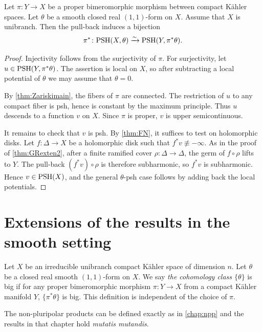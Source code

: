 \begin{corollary}\label{cor:PSH}
    Let $\pi\colon Y\rightarrow X$ be a proper bimeromorphic morphism between compact K\"ahler spaces. Let $\theta$ be a smooth closed real $(1,1)$-form on $X$. Assume that $X$ is unibranch. Then the pull-back induces a bijection
    \[
    \pi^*\colon \mathrm{PSH}(X,\theta)\xrightarrow[]{\sim}\mathrm{PSH}(Y,\pi^*\theta).
    \]
\end{corollary}
\begin{proof}
    Injectivity follows from the surjectivity of $\pi$. For surjectivity, let $u\in \mathrm{PSH}(Y,\pi^*\theta)$. The assertion is local on $X$, so after subtracting a local potential of $\theta$ we may assume that $\theta=0$.

    By \cref{thm:Zariskimain}, the fibers of $\pi$ are connected. The restriction of $u$ to any compact fiber is psh, hence is constant by the maximum principle. Thus $u$ descends to a function $v$ on $X$. Since $\pi$ is proper, $v$ is upper semicontinuous.

    It remains to check that $v$ is psh. By \cref{thm:FN}, it suffices to test on holomorphic disks. Let $f\colon \Delta\rightarrow X$ be a holomorphic disk such that $f^*v\not\equiv -\infty$. As in the proof of \cref{thm:GRexten2}, after a finite ramified cover $\rho\colon \Delta\rightarrow \Delta$, the germ of $f\circ\rho$ lifts to $Y$. The pull-back $(f^*v)\circ\rho$ is therefore subharmonic, so $f^*v$ is subharmonic. Hence $v\in \mathrm{PSH}(X)$, and the general $\theta$-psh case follows by adding back the local potentials.
\end{proof}

\section{Extensions of the results in the smooth setting}
\label{sec:unib_ext}
Let $X$ be an irreducible unibranch compact K\"ahler space of dimension $n$. Let $\theta$ be a closed real smooth $(1,1)$-form on $X$. We say \emph{the cohomology class $\{\theta\}$} is big if for any proper bimeromorphic morphism $\pi\colon Y\rightarrow X$ from a compact K\"ahler manifold $Y$, $\{\pi^*\theta\}$ is big. This definition is independent of the choice of $\pi$.

The non-pluripolar products can be defined exactly as in \cref{chap:npp} and the results in that chapter hold \emph{mutatis mutandis}.

